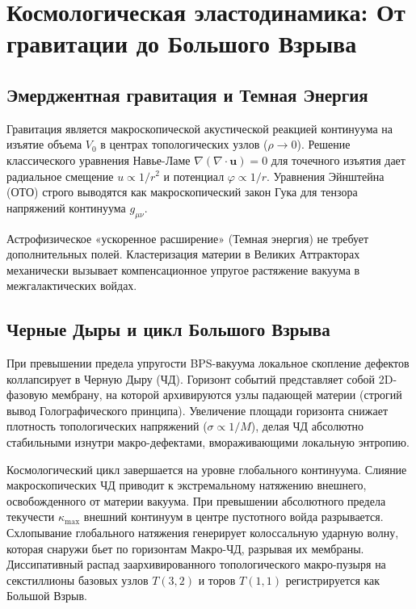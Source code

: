 \documentclass[12pt,a4paper]{article}
\begin{document}
\section{Космологическая эластодинамика: От гравитации до Большого Взрыва}

\subsection{Эмерджентная гравитация и Темная Энергия}
Гравитация является макроскопической акустической реакцией континуума на изъятие объема $V_0$ в центрах топологических узлов ($\rho \to 0$). Решение классического уравнения Навье-Ламе $\nabla(\nabla \cdot \mathbf{u}) = 0$ для точечного изъятия дает радиальное смещение $u \propto 1/r^2$ и потенциал $\varphi \propto 1/r$. Уравнения Эйнштейна (ОТО) строго выводятся как макроскопический закон Гука для тензора напряжений континуума $g_{\mu\nu}$. 

Астрофизическое «ускоренное расширение» (Темная энергия) не требует дополнительных полей. Кластеризация материи в Великих Аттракторах механически вызывает компенсационное упругое растяжение вакуума в межгалактических войдах.

\subsection{Черные Дыры и цикл Большого Взрыва}
При превышении предела упругости BPS-вакуума локальное скопление дефектов коллапсирует в Черную Дыру (ЧД). Горизонт событий представляет собой 2D-фазовую мембрану, на которой архивируются узлы падающей материи (строгий вывод Голографического принципа). Увеличение площади горизонта снижает плотность топологических напряжений ($\sigma \propto 1/M$), делая ЧД абсолютно стабильными изнутри макро-дефектами, вмораживающими локальную энтропию.

Космологический цикл завершается на уровне глобального континуума. Слияние макроскопических ЧД приводит к экстремальному натяжению внешнего, освобожденного от материи вакуума. При превышении абсолютного предела текучести $\kappa_{\text{max}}$ внешний континуум в центре пустотного войда разрывается. Схлопывание глобального натяжения генерирует колоссальную ударную волну, которая снаружи бьет по горизонтам Макро-ЧД, разрывая их мембраны. Диссипативный распад заархивированного топологического макро-пузыря на секстиллионы базовых узлов $T(3,2)$ и торов $T(1,1)$ регистрируется как Большой Взрыв.
\end{document}
